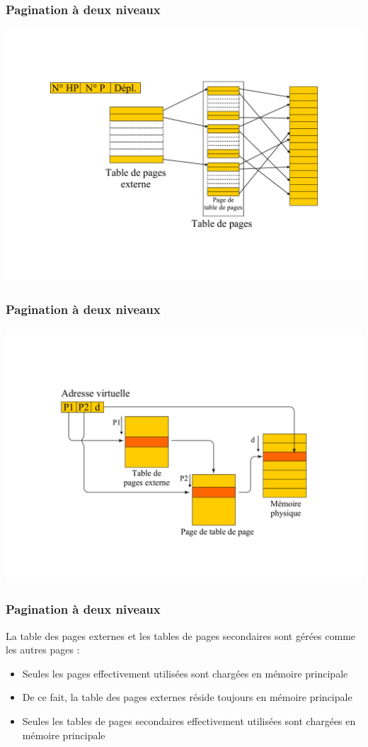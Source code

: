 \begin{frame}
\frametitle{Pagination à deux niveaux}
\includegraphics[width=\textwidth]{../illustration/pagination_2_niveaux.pdf}
\end{frame}


\begin{frame}
\frametitle{Pagination à deux niveaux}
\includegraphics[width=\textwidth]{../illustration/memoire_paginee_deux_niveaux_calcul.pdf}
\end{frame}


\begin{frame}
\frametitle{Pagination à deux niveaux}
La table des pages externes et les tables de pages secondaires sont gérées comme les autres pages :
\begin{itemize}
\item Seules les pages effectivement utilisées sont chargées en mémoire principale
\item De ce fait, la table des pages externes réside toujours en mémoire principale
\item Seules les tables de pages secondaires effectivement utilisées sont chargées en mémoire principale
\end{itemize}
\end{frame}


